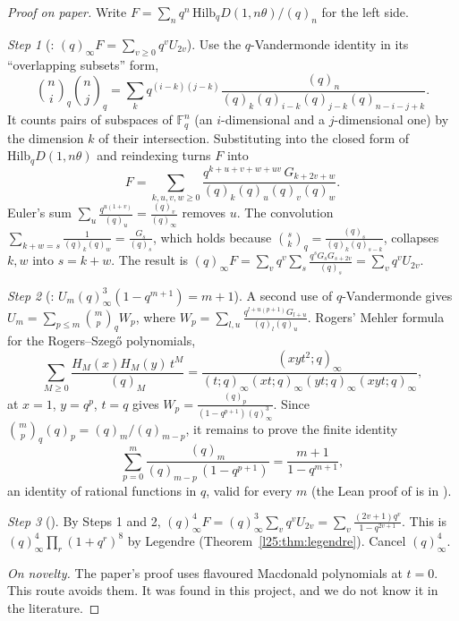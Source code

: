 \begin{proof}[Proof on paper]
Write $F=\sum_nq^n\,\mathrm{Hilb}_qD(1,n\theta)/(q)_n$ for the left side.

\emph{Step 1} (: $(q)_\infty F=\sum_{v\ge0}q^vU_{2v}$). Use the $q$-Vandermonde identity in its
``overlapping subsets'' form,
\begin{equation*}
\binom ni_q\binom nj_q=\sum_kq^{(i-k)(j-k)}\frac{(q)_n}{(q)_k(q)_{i-k}(q)_{j-k}(q)_{n-i-j+k}} .
\end{equation*}
It counts pairs of subspaces of $\mathbb F_q^n$ (an $i$-dimensional and a $j$-dimensional one) by the dimension $k$ of
their intersection. Substituting into the closed form of $\mathrm{Hilb}_qD(1,n\theta)$ and reindexing turns $F$ into
\begin{equation*}
F=\sum_{k,u,v,w\ge0}\frac{q^{k+u+v+w+uv}\,G_{k+2v+w}}{(q)_k(q)_u(q)_v(q)_w}.
\end{equation*}
Euler's sum $\sum_u\frac{q^{u(1+v)}}{(q)_u}=\frac{(q)_v}{(q)_\infty}$ removes $u$. The convolution
$\sum_{k+w=s}\frac1{(q)_k(q)_w}=\frac{G_s}{(q)_s}$, which holds because $\binom sk_q=\frac{(q)_s}{(q)_k(q)_{s-k}}$,
collapses $k,w$ into $s=k+w$. The
result is $(q)_\infty F=\sum_vq^v\sum_s\frac{q^sG_sG_{s+2v}}{(q)_s}=\sum_vq^vU_{2v}$.

\emph{Step 2} (: $U_m(q)_\infty^3(1-q^{m+1})=m+1$). A second use of $q$-Vandermonde gives
$U_m=\sum_{p\le m}\binom mp_qW_p$, where $W_p=\sum_{l,u}\frac{q^{l+u(p+1)}G_{l+u}}{(q)_l(q)_u}$. Rogers' Mehler formula for
the Rogers--Szeg\H{o} polynomials,
\begin{equation*}
\sum_{M\ge0}\frac{H_M(x)H_M(y)\,t^M}{(q)_M}=\frac{(xyt^2;q)_\infty}{(t;q)_\infty(xt;q)_\infty(yt;q)_\infty(xyt;q)_\infty},
\end{equation*}
at $x=1$, $y=q^p$, $t=q$ gives $W_p=\frac{(q)_p}{(1-q^{p+1})(q)_\infty^3}$. Since $\binom mp_q(q)_p=(q)_m/(q)_{m-p}$, it
remains to prove the finite identity
\begin{equation*}
\sum_{p=0}^m\frac{(q)_m}{(q)_{m-p}\,(1-q^{p+1})}=\frac{m+1}{1-q^{m+1}},
\end{equation*}
an identity of rational functions in $q$, valid for every $m$ (the Lean proof of  is in
).

\emph{Step 3} (). By Steps 1 and 2,
$(q)_\infty^4F=(q)_\infty^3\sum_vq^vU_{2v}=\sum_v\frac{(2v+1)q^v}{1-q^{2v+1}}$. This is
$(q)_\infty^4\prod_r(1+q^r)^8$ by Legendre (Theorem~\ref{l25:thm:legendre}). Cancel $(q)_\infty^4$.

\emph{On novelty.} The paper's proof uses flavoured Macdonald polynomials at $t=0$. This route avoids them. It was found
in this project, and we do not know it in the literature.
\end{proof}
